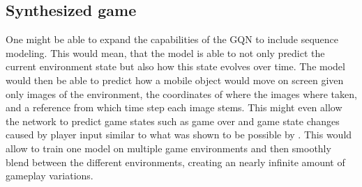 \subsection{Synthesized game}
One might be able to expand the capabilities of the GQN to include sequence modeling. This would mean, that the model is able to not only predict the current environment state but also how this state evolves over time. The model would then be able to predict how a mobile object would move on screen given only images of the environment, the coordinates of where the images where taken, and a reference from which time step each image stems. This might even allow the network to predict game states such as game over and game state changes caused by player input similar to what was shown to be possible by \cite{Ha2018-dd}. This would allow to train one model on multiple game environments and then smoothly blend between the different environments, creating an nearly infinite amount of gameplay variations.
